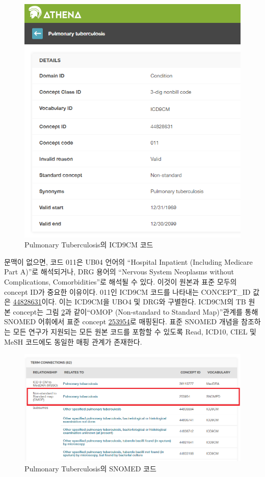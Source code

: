 \documentclass[11pt]{book}
\theoremstyle{definition}
\theoremstyle{definition}
\theoremstyle{definition}
\theoremstyle{remark}
\begin{document}
\begin{figure}

{\centering \includegraphics[width=0.75\linewidth]{images/CommonDataModel/pulmTubICD9} 

}

\caption{Pulmonary Tuberculosis의 ICD9CM 코드}\label{fig:pulmTubICD9}
\end{figure}

문맥이 없으면, 코드 011은 UB04 언어의 ``Hospital Inpatient (Including
Medicare Part A)''로 해석되거나, DRG 용어의 ``Nervous System Neoplasms
without Complications, Comorbidities''로 해석될 수 있다. 이것이 원본과
표준 모두의 concept ID가 중요한 이유이다. 011인 ICD9CM 코드를 나타내는
CONCEPT\_ID 값은
\href{http://athena.ohdsi.org/search-terms/terms/44828631}{44828631}이다.
이는 ICD9CM을 UBO4 및 DRG와 구별한다. ICD9CM의 TB 원본 concept는 그림
\ref{fig:pulmTubMap}과 같이``OMOP (Non-standard to Standard Map)''관계를
통해 SNOMED 어휘에서 표준 concept
\href{http://athena.ohdsi.org/search-terms/terms/253954}{253954}로
매핑된다. 표준 SNOMED 개념을 참조하는 모든 연구가 지원되는 모든 원본
코드를 포함할 수 있도록 Read, ICD10, CIEL 및 MeSH 코드에도 동일한 매핑
관계가 존재한다.

\begin{figure}

{\centering \includegraphics[width=1\linewidth]{images/CommonDataModel/pulmTubMap} 

}

\caption{Pulmonary Tuberculosis의 SNOMED 코드}\label{fig:pulmTubMap}
\end{figure}
\end{document}
